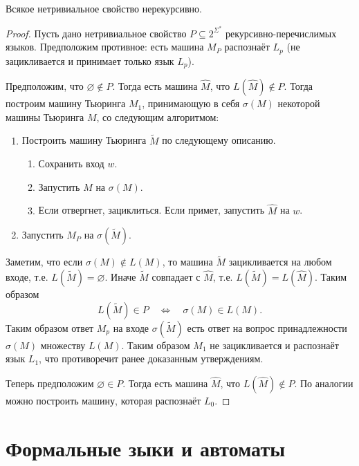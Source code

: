\documentclass[12pt,a4paper]{article}
\begin{document}
    \begin{theorem}[Райса]
        Всякое нетривиальное свойство нерекурсивно.
    \end{theorem}

    \begin{proof}
        Пусть дано нетривиальное свойство $P \subseteq 2^{\Sigma^*}$ рекурсивно-перечислимых языков. Предположим противное: есть машина $M_P$ распознаёт $L_p$ (не зацикливается и принимает только язык $L_p$).

        Предположим, что $\varnothing \notin P$. Тогда есть машина $\widehat{M}$, что $L(\widehat{M}) \notin P$. Тогда построим машину Тьюринга $M_1$, принимающую в себя $\sigma(M)$ некоторой машины Тьюринга $M$, со следующим алгоритмом:
        \begin{enumerate}
            \item Построить машину Тьюринга $\widetilde{M}$ по следующему описанию.
                \begin{enumerate}
                    \item Сохранить вход $w$.
                    \item Запустить $M$ на $\sigma(M)$.
                    \item Если отвергнет, зациклиться. Если примет, запустить $\widehat{M}$ на $w$.
                \end{enumerate}
            \item Запустить $M_P$ на $\sigma(\widetilde{M})$.
        \end{enumerate}
        Заметим, что если $\sigma(M) \notin L(M)$, то машина $\widetilde{M}$ зацикливается на любом входе, т.е. $L(\widetilde{M}) = \varnothing$. Иначе $\widetilde{M}$ совпадает с $\widehat{M}$, т.е. $L(\widetilde{M}) = L(\widehat{M})$. Таким образом
        \[L(\widetilde{M}) \in P \quad \Longleftrightarrow \quad \sigma(M) \in L(M).\]
        Таким образом ответ $M_p$ на входе $\sigma(\widetilde{M})$ есть ответ на вопрос принадлежности $\sigma(M)$ множеству $L(M)$. Таким образом $M_1$ не зацикливается и распознаёт язык $L_1$, что противоречит ранее доказанным утверждениям.

        Теперь предположим $\varnothing \in P$. Тогда есть машина $\widehat{M}$, что $L(\widehat{M}) \notin P$. По аналогии можно построить машину, которая распознаёт $L_0$.
    \end{proof}

    \section{Формальные зыки и автоматы}
\end{document}
